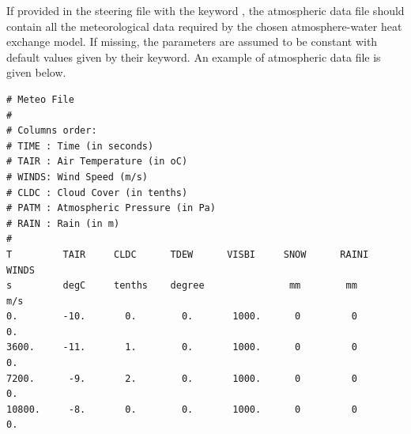 If provided in the  steering file with the keyword ,
the atmospheric data file should contain all the meteorological data required by the chosen
atmosphere-water heat exchange model.
If missing, the parameters are assumed to be constant with default values given by their keyword.
An example of atmospheric data file is given below.

\lstset{language=TelemacCas,
        basicstyle=\scriptsize\ttfamily}
\begin{lstlisting}
# Meteo File
#
# Columns order:
# TIME : Time (in seconds)
# TAIR : Air Temperature (in oC)
# WINDS: Wind Speed (m/s)
# CLDC : Cloud Cover (in tenths)
# PATM : Atmospheric Pressure (in Pa)
# RAIN : Rain (in m)
#
T         TAIR     CLDC      TDEW      VISBI     SNOW      RAINI     WINDS
s         degC     tenths    degree               mm        mm        m/s
0.        -10.       0.        0.       1000.      0         0         0.
3600.     -11.       1.        0.       1000.      0         0         0.
7200.      -9.       2.        0.       1000.      0         0         0.
10800.     -8.       0.        0.       1000.      0         0         0.
\end{lstlisting}


\clearpage
